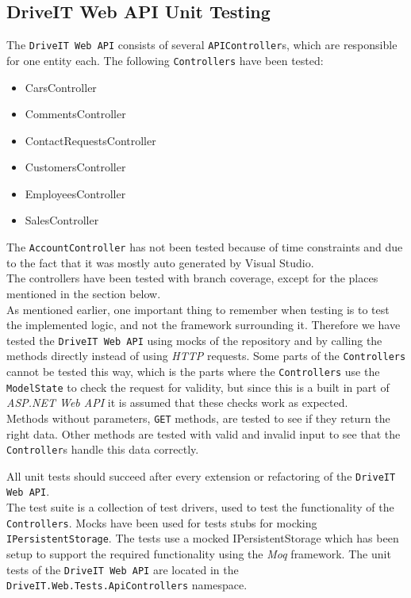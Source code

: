 \subsection{DriveIT Web API Unit Testing}
The \texttt{DriveIT Web API} consists of several \texttt{APIController}s, which are responsible for one entity each. The following \texttt{Controllers} have been tested:
\begin{itemize}
	\item CarsController
	\item CommentsController
	\item ContactRequestsController
	\item CustomersController
	\item EmployeesController
	\item SalesController
\end{itemize}
The \texttt{AccountController} has not been tested because of time constraints and due to the fact that it was mostly auto generated by Visual Studio.\\

The controllers have been tested with branch coverage, except for the places mentioned in the section below.\\

As mentioned earlier, one important thing to remember when testing is to test the implemented logic, and not the framework surrounding it. Therefore we have tested the \texttt{DriveIT Web API} using mocks of the repository and by calling the methods directly instead of using \textit{HTTP} requests.
Some parts of the \texttt{Controllers} cannot be tested this way, which is the parts where the \texttt{Controllers} use the \texttt{ModelState} to check the request for validity, but since this is a built in part of \textit{ASP.NET Web API} it is assumed that these checks work as expected.\\

Methods without parameters, \texttt{GET} methods, are tested to see if they return the right data. Other methods are tested with valid and invalid input to see that the \texttt{Controller}s handle this data correctly.

All unit tests should succeed after every extension or refactoring of the \texttt{DriveIT Web API}.\\

The test suite is a collection of test drivers, used to test the functionality of the \texttt{Controllers}.
Mocks have been used for tests stubs for mocking \texttt{IPersistentStorage}. The tests use a mocked IPersistentStorage which has been setup to support the required functionality using the \textit{Moq} framework.
The unit tests of the \texttt{DriveIT Web API} are located in the \texttt{DriveIT.Web.Tests.ApiControllers} namespace.\\

